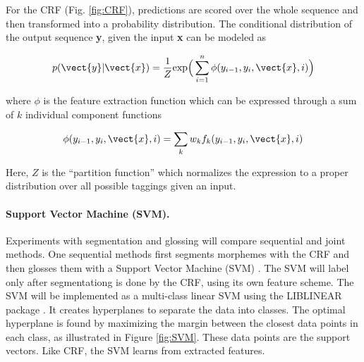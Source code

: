
For the CRF (Fig. \ref{fig:CRF}), predictions are scored over the whole sequence and then transformed into a probability distribution. The conditional distribution of the output sequence {\bf y}, given the input {\bf x} can be modeled as

\begin{equation}
p(\vect{y}|\vect{x}) = \frac{1}{Z} \textrm{exp}\Big(\sum_{i=1}^n\phi(y_{i-1}, y_i,\vect{x},i)\Big)
\end{equation}

\noindent where $\phi$ is the feature extraction function which can be expressed through a sum of $k$ individual component functions

\begin{equation}
\phi(y_{i-1}, y_i,\vect{x},i) = \sum_k w_k f_k(y_{i-1}, y_i,\vect{x},i)
\end{equation}

\noindent Here, $Z$ is the ``partition function'' which normalizes the expression to a proper distribution over all possible taggings given an input. 

\paragraph{Support Vector Machine (SVM).} Experiments with segmentation and glossing will compare sequential and joint methods. One sequential methods first segments morphemes with the CRF and then glosses them with a Support Vector Machine (SVM) \citep{svm_cortes}. The SVM will label only after segmentationg is done by the CRF, using its own feature scheme. The SVM will be implemented as a multi-class linear SVM using the LIBLINEAR package \citep{fan2008}. It creates hyperplanes to separate the data into classes. The optimal hyperplane is found by maximizing the margin between the closest data points in each class, as illustrated in Figure \ref{fig:SVM}. These data points are the support vectors. Like CRF, the SVM learns from extracted features.

